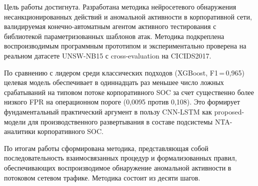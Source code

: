 Цель работы достигнута. Разработана методика нейросетевого
обнаружения несанкционированных действий и аномальной активности
в корпоративной сети, валидируемая конечно-автоматным агентом
активного тестирования с библиотекой параметризованных шаблонов
атак. Методика подкреплена воспроизводимым программным прототипом
и экспериментально проверена на реальном датасете UNSW-NB15 с
cross-evaluation на CICIDS2017.

По сравнению с лидером среди классических подходов
(XGBoost, F1\,=\,0,965) целевая модель обеспечивает в
одиннадцать раз меньшее число ложных срабатываний на типовом
потоке корпоративного SOC за счет существенно более низкого FPR
на операционном пороге (0,0095 против 0,108). Это формирует
фундаментальный практический аргумент в пользу CNN-LSTM как
proposed-модели для производственного развертывания в составе
подсистемы NTA-аналитики корпоративного SOC.

\medskip

По итогам работы сформирована методика, представляющая собой
последовательность взаимосвязанных процедур и формализованных
правил, обеспечивающих воспроизводимое обнаружение аномальной
активности в потоковом сетевом трафике. Методика состоит из десяти
шагов.

